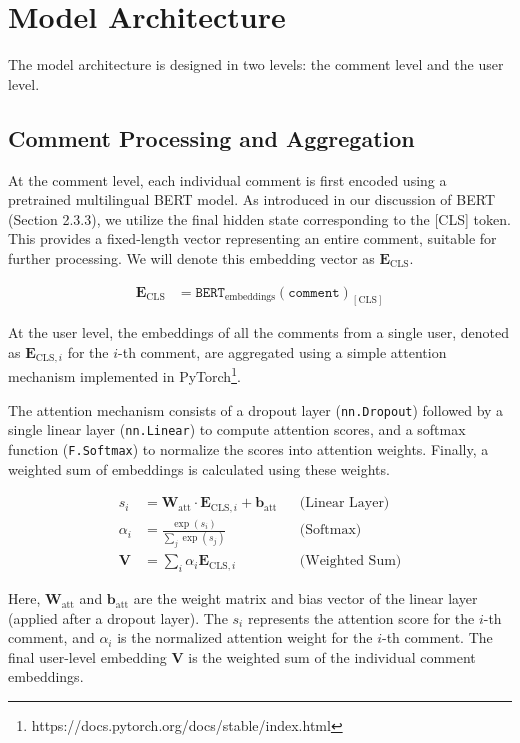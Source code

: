 \documentclass[twoside]{ctuthesis}
\theoremstyle{plain}
\theoremstyle{definition}
\theoremstyle{note}
\begin{document}
\section{Model Architecture}
The model architecture is designed in two levels: the comment level and the user level. 

\subsection{Comment Processing and Aggregation}

At the comment level, each individual comment is first encoded using a pretrained multilingual BERT model. As introduced in our discussion of BERT (Section 2.3.3), we utilize the final hidden state corresponding to the [CLS] token. This provides a fixed-length vector representing an entire comment, suitable for further processing. We will denote this embedding vector as \( \mathbf{E}_{\mathrm{CLS}} \).

\begin{align}
    \mathbf{E}_{\mathrm{CLS}} &= \texttt{BERT}_{\mathrm{embeddings}}(\texttt{comment})_{[\mathrm{CLS}]}
\end{align}

At the user level, the embeddings of all the comments from a single user, denoted as \( \mathbf{E}_{\mathrm{CLS}, i} \) for the \( i \)-th comment, are aggregated using a simple attention mechanism implemented in PyTorch\footnote{https://docs.pytorch.org/docs/stable/index.html}. 

The attention mechanism consists of a dropout layer (\texttt{nn.Dropout}) followed by a single linear layer (\texttt{nn.Linear}) to compute attention scores, and a softmax function (\texttt{F.Softmax}) to normalize the scores into attention weights. Finally, a weighted sum of embeddings is calculated using these weights.

\begin{align}
    s_i &= \mathbf{W}_{\mathrm{att}} \cdot \mathbf{E}_{\mathrm{CLS}, i} + \mathbf{b}_{\mathrm{att}} && \text{(Linear Layer)} \\
    \alpha_i &= \frac{\exp(s_i)}{\sum_{j} \exp(s_j)} && \text{(Softmax)} \\
    \mathbf{V} &= \sum_i \alpha_i \mathbf{E}_{\mathrm{CLS}, i} && \text{(Weighted Sum)}
\end{align}

Here, \( \mathbf{W}_{\mathrm{att}} \) and \( \mathbf{b}_{\mathrm{att}} \) are the weight matrix and bias vector of the linear layer (applied after a dropout layer). The \( s_i \) represents the attention score for the \( i \)-th comment, and \( \alpha_i \) is the normalized attention weight for the \( i \)-th comment. The final user-level embedding \( \mathbf{V} \) is the weighted sum of the individual comment embeddings.
\end{document}

